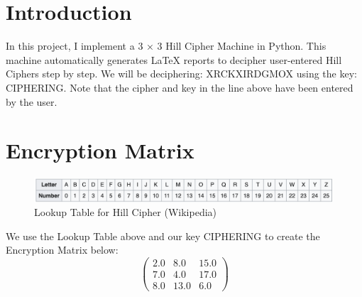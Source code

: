 \documentclass{article}%
\begin{document}
%
\normalsize%
\section{Introduction}%
\label{sec:Introduction}%
In this project, I implement a 3  ×  3 Hill Cipher Machine in Python. This machine automatically generates LaTeX reports to decipher user{-}entered Hill Ciphers step by step. \newline%
 \newline%
%
We will be deciphering: XRCKXIRDGMOX using the key: CIPHERING. \newline%
 \newline%
%
Note that the cipher and key in the line above have been entered by the user.

%
\section{Encryption Matrix}%
\label{sec:EncryptionMatrix}%


\begin{figure}[h!]%
\centering%
\includegraphics[width=420px]{./LookupHill.png}%
\caption{Lookup Table for Hill Cipher (Wikipedia)}%
\end{figure}

%
We use the Lookup Table above and our key CIPHERING to create the Encryption Matrix below: \newline%
%
\[%
\begin{pmatrix}%
2.0&8.0&15.0\\%
7.0&4.0&17.0\\%
8.0&13.0&6.0%
\end{pmatrix}%
\]

%
\end{document}

